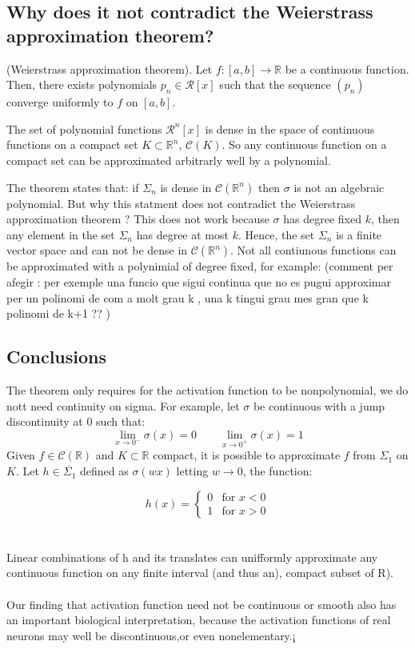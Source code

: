 \documentclass[../main.tex]{subfiles}
\begin{document}
\subsection{Why does it not contradict the Weierstrass approximation theorem? }
\begin{theorem}(Weierstrass  approximation theorem). 
	Let $f:[a,b]\rightarrow \mathbb{R} $ be a continuous function. Then, there exists polynomials $p_n\in \mathcal{R}[x]$ such that the sequence $(p_n)$ converge uniformly to $f$ on $[a,b]$. 
\end{theorem} 

\begin{corolari}
	The set of polynomial functions $\mathcal{R}^n[x]$ is dense in the space of continuous functions on a compact set $K \subset \mathbb{R}^n$, $\mathcal{C}(K)$. So any continuous function on a compact set can be approximated arbitrarly well by a polynomial. 
\end{corolari}

\noindent The theorem states that: if $\Sigma_n$ is dense in $\mathcal{C}(\mathbb{R}^n)$ then $\sigma$ is not an algebraic polynomial. But why this statment does not contradict the Weierstrass approximation theorem ?
This does not work because $\sigma$ has degree fixed $k$, then any element in the set $\Sigma_n$ has degree at most $k$. Hence, the set $\Sigma_n$ is a finite vector space and can not be dense in $\mathcal{C}(\mathbb{R}^n)$. Not all contiunous functions can be approximated with a polynimial of degree fixed, for example: 
(comment per afegir : per exemple una funcio que sigui continua que no es pugui approximar per un polinomi de com a molt grau k , una k tingui grau mes gran que k polinomi de k+1 ?? )


\subsection{Conclusions}


	\noindent The theorem only requires for the activation function to be nonpolynomial, we do nott need continuity on sigma. For example, let $\sigma$ be continuous with a jump discontinuity at 0 such that: $$\lim_{x\to 0^-} \sigma(x)=0 \qquad \lim_{x \to 0^+} \sigma(x) =1$$
	Given $f \in \mathcal{C}(\mathbb{R})$ and $K \subset \mathbb{R}$ compact, it is possible to approximate $f$ from $\Sigma_1 $ on $K$. Let $h\in \overline{\Sigma_1}$ defined as $\sigma(wx)$ letting $w \rightarrow 0$, the function:
	
	\[
	h(x) = \begin{cases} 
		0 & \text{for } x < 0 \\
		1 & \text{for } x > 0 
	\end{cases}
	\] \\ \\ 
	Linear combinations of h and its translates can unifformly approximate any continuous function on any finite interval (and thus an), compact subset of R).
	\\ \\
	Our finding that activation function need not be continuous or smooth also has an important biological interpretation, because the activation functions of real neurons may well be discontinuous,or even nonelementary.¡
\end{document}

